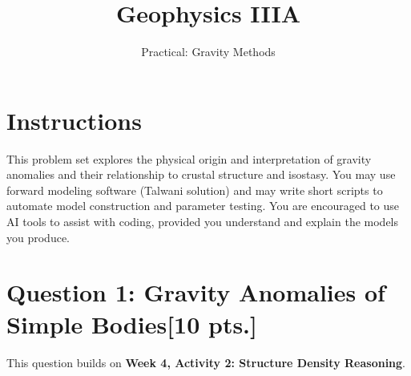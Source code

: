 \documentclass[11pt,a4paper,final]{article}
\title{Geophysics IIIA}
\author{Practical: Gravity Methods}
\begin{document}
\maketitle

\section*{Instructions}
This problem set explores the physical origin and interpretation of gravity anomalies and their relationship to crustal structure and isostasy.  You may use forward modeling software (Talwani solution) and may write short scripts to automate model construction and parameter testing.  You are encouraged to use AI tools to assist with coding, provided you understand and explain the models you produce.

\bigskip

\section*{Question 1: Gravity Anomalies of Simple Bodies\hfill [10 pts.]}

This question builds on \textbf{Week 4, Activity 2: Structure Density Reasoning}.
\end{document}
